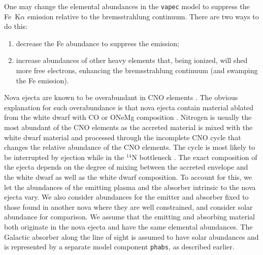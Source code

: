 \documentclass[a4paper,fleqn,usenatbib]{mnras}
\begin{document}
One may change the elemental abundances in the \texttt{vapec} model to suppress 
the Fe~K$\alpha$ emission relative to the bremsstrahlung continuum. There
are two ways to do this:
\begin{enumerate}
\item decrease the Fe abundance to suppress the emission;
\item increase abundances of other heavy elements that, being ionized, will
shed more free electrons, enhancing the bremsstrahlung continuum (and
swamping the Fe emission).
\end{enumerate}

Nova ejecta are known to be overabundant in CNO elements
\citep{1985ESOC...21..225W,1986ApJ...308..721T,1998PASP..110....3G,2001MNRAS.320..103S,2005ApJ...624..914V,2012ApJ...755...37H}. 
The obvious explanation for such overabundance is that 
nova ejecta contain material ablated from the white dwarf with 
CO or ONeMg composition \citep[e.g.][and references therein]{2018ApJ...860..110S,2021JApA...42...13D}. 
%
Nitrogen is usually the most abundant of the CNO elements as the accreted material
is mixed with the white dwarf material and processed through the incomplete CNO cycle \citep{1972ApJ...176..169S,1986ApJ...308..721T} 
that changes the relative abundance of the CNO elements. 
The cycle is most likely to be interrupted by ejection while in the $^{14}$N bottleneck 
\citep[e.g.][]{2004A&A...420..625I,2006PhLB..634..483L}.
%
The exact composition of the ejecta depends on the degree 
of mixing between the accreted envelope and the white dwarf
\citep{2011Natur.478..490C,2016A&A...595A..28C,2018A&A...619A.121C,2013ApJ...762....8D,2022A&A...660A..53G} 
as well as the white dwarf composition.
To account for this, we let the abundances of the emitting plasma and the absorber intrinsic to the nova
ejecta vary. We also consider abundances for the emitter and absorber fixed to those found in another nova where they
are well constrained, and consider solar abundance for comparison.
We assume that the emitting and absorbing material both originate in the nova
ejecta and have the same elemental abundances. The Galactic absorber along
the line of sight is assumed to have solar abundances and is represented by
a separate model component \texttt{phabs}, as described earlier.
\end{document}
